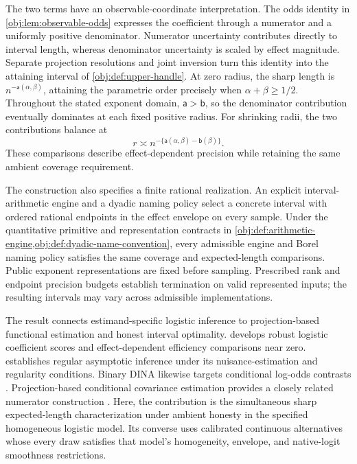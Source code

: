 \documentclass[11pt]{article}
\begin{document}
The two terms have an observable-coordinate interpretation. The odds identity in \cref{obj:lem:observable-odds} expresses the coefficient through a numerator and a uniformly positive denominator. Numerator uncertainty contributes directly to interval length, whereas denominator uncertainty is scaled by effect magnitude. Separate projection resolutions and joint inversion turn this identity into the attaining interval of \cref{obj:def:upper-handle}. At zero radius, the sharp length is \(n^{-\mathsf a(\alpha,\beta)}\), attaining the parametric order precisely when \(\alpha+\beta\ge1/2\). Throughout the stated exponent domain, \(\mathsf a>\mathsf b\), so the denominator contribution eventually dominates at each fixed positive radius. For shrinking radii, the two contributions balance at
\[
r\asymp n^{-\{\mathsf a(\alpha,\beta)-\mathsf b(\beta)\}}.
\]
These comparisons describe effect-dependent precision while retaining the same ambient coverage requirement.

The construction also specifies a finite rational realization. An explicit interval-arithmetic engine and a dyadic naming policy select a concrete interval with ordered rational endpoints in the effect envelope on every sample. Under the quantitative primitive and representation contracts in \cref{obj:def:arithmetic-engine,obj:def:dyadic-name-convention}, every admissible engine and Borel naming policy satisfies the same coverage and expected-length comparisons. Public exponent representations are fixed before sampling. Prescribed rank and endpoint precision budgets establish termination on valid represented inputs; the resulting intervals may vary across admissible implementations.

The result connects estimand-specific logistic inference to projection-based functional estimation and honest interval optimality. \citet[Propositions 1--3]{Tan2019LogisticDR} develops robust logistic coefficient scores and effect-dependent efficiency comparisons near zero. \citet[arXiv version 1, Assumptions REG and ML1, Theorem 2]{LiuZhangZhou2020LogisticDML} establishes regular asymptotic inference under its nuisance-estimation and regularity conditions. Binary DINA likewise targets conditional log-odds contrasts \citep[Section 2.1.1, equation (5)]{GaoHastie2025DINA}. Projection-based conditional covariance estimation provides a closely related numerator construction \citep[version 5, Theorem 1 and Corollary 1]{McGrath2026}. Here, the contribution is the simultaneous sharp expected-length characterization under ambient honesty in the specified homogeneous logistic model. Its converse uses calibrated continuous alternatives whose every draw satisfies that model's homogeneity, envelope, and native-logit smoothness restrictions.
\end{document}

